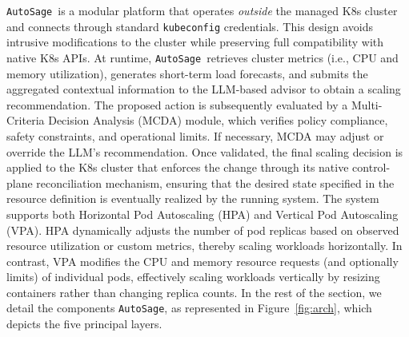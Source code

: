 \documentclass[sigconf]{acmart}
\newcommand{\Solution}{\texttt{AutoSage}}
\begin{document}
\Solution\ is a modular platform that operates \emph{outside} the managed
K8s cluster and connects through standard \texttt{kubeconfig} credentials. This design avoids intrusive modifications to the cluster while preserving full compatibility with native K8s APIs.
At runtime, \Solution\ retrieves cluster metrics (i.e., CPU and memory utilization), generates short-term load forecasts, and submits the aggregated contextual information to the LLM-based advisor to obtain a scaling recommendation. The proposed action is subsequently evaluated by a Multi-Criteria Decision Analysis (MCDA) module, which verifies policy compliance, safety constraints, and operational limits. If necessary, MCDA may adjust or override the LLM’s recommendation.
Once validated, the final scaling decision is applied to the K8s cluster 
that enforces the change through its native control-plane reconciliation mechanism, ensuring that the desired state specified in the resource definition is eventually realized by the running system.
%
The system supports both Horizontal Pod Autoscaling (HPA) and Vertical Pod Autoscaling (VPA). HPA dynamically adjusts the number of pod replicas based on observed resource utilization or custom metrics, thereby scaling workloads horizontally. In contrast, VPA modifies the CPU and memory resource requests (and optionally limits) of individual pods, effectively scaling workloads vertically by resizing containers rather than changing replica counts.
%
%
In the rest of the section, we detail the components \Solution, as represented in Figure~\ref{fig:arch}, which depicts the five principal layers.
\end{document}
